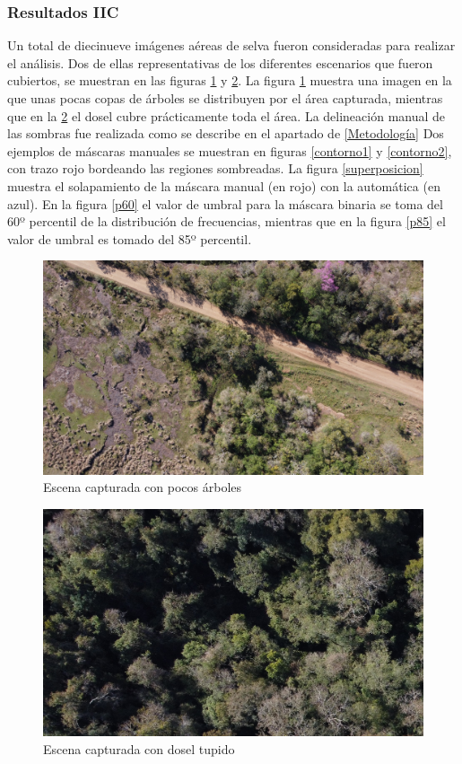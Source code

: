\subsubsection{Resultados IIC} \label{Resultados}
Un total de diecinueve imágenes aéreas de selva fueron consideradas para realizar el análisis. Dos de ellas representativas de los diferentes escenarios que fueron cubiertos, se muestran en las figuras \ref{calle} y \ref{tupido}. La figura \ref{calle} muestra una imagen en la que unas pocas copas de árboles se distribuyen por el área capturada, mientras que en la \ref{tupido} el dosel cubre prácticamente toda el área. La delineación manual de las sombras fue realizada como se describe en el apartado de \ref{Metodología}
Dos ejemplos de máscaras manuales se muestran en figuras \ref{contorno1} y \ref{contorno2}, con trazo rojo bordeando las regiones sombreadas. La figura \ref{superposicion} muestra el solapamiento de la máscara manual (en rojo) con la automática (en azul). En la figura \ref{p60} el valor de umbral para la máscara binaria se toma del 60º percentil de la distribución de frecuencias, mientras que en la figura \ref{p85} el valor de umbral es tomado del 85º percentil.

\begin{figure}
    \includegraphics[width=\textwidth]{Imagenes/street.jpg}
     \hfill
     \caption{Escena capturada con pocos árboles}
    \label{calle}
\end{figure}

\begin{figure}
    \includegraphics[width=\textwidth]{Imagenes/dense canopy.jpg}
     \hfill
     \caption{Escena capturada con dosel tupido}
    \label{tupido}
\end{figure}



